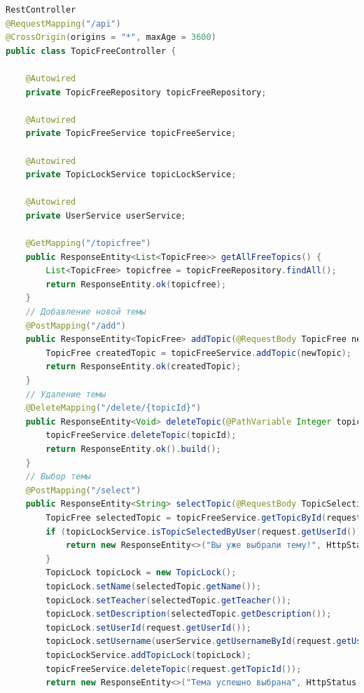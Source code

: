 \documentclass[14pt]{extarticle} %
\begin{document}
\begin{lstlisting}[language=Java, caption={Контроллер свободных тем}]
RestController
@RequestMapping("/api")
@CrossOrigin(origins = "*", maxAge = 3600)
public class TopicFreeController {

    @Autowired
    private TopicFreeRepository topicFreeRepository;

    @Autowired
    private TopicFreeService topicFreeService;

    @Autowired
    private TopicLockService topicLockService;

    @Autowired
    private UserService userService;

    @GetMapping("/topicfree")
    public ResponseEntity<List<TopicFree>> getAllFreeTopics() {
        List<TopicFree> topicfree = topicFreeRepository.findAll();
        return ResponseEntity.ok(topicfree);
    }
    // Добавление новой темы
    @PostMapping("/add")
    public ResponseEntity<TopicFree> addTopic(@RequestBody TopicFree newTopic) {
        TopicFree createdTopic = topicFreeService.addTopic(newTopic);
        return ResponseEntity.ok(createdTopic);
    }
    // Удаление темы
    @DeleteMapping("/delete/{topicId}")
    public ResponseEntity<Void> deleteTopic(@PathVariable Integer topicId) {
        topicFreeService.deleteTopic(topicId);
        return ResponseEntity.ok().build();
    }
    // Выбор темы
    @PostMapping("/select")
    public ResponseEntity<String> selectTopic(@RequestBody TopicSelectionRequest request){
        TopicFree selectedTopic = topicFreeService.getTopicById(request.getTopicId());
        if (topicLockService.isTopicSelectedByUser(request.getUserId())) {
            return new ResponseEntity<>("Вы уже выбрали тему!", HttpStatus.CONFLICT);
        }
        TopicLock topicLock = new TopicLock();
        topicLock.setName(selectedTopic.getName());
        topicLock.setTeacher(selectedTopic.getTeacher());
        topicLock.setDescription(selectedTopic.getDescription());
        topicLock.setUserId(request.getUserId());
        topicLock.setUsername(userService.getUsernameById(request.getUserId()));
        topicLockService.addTopicLock(topicLock);
        topicFreeService.deleteTopic(request.getTopicId());
        return new ResponseEntity<>("Тема успешно выбрана", HttpStatus.OK);}}
\end{lstlisting}

\label{suggestTopicController}
\end{document}
